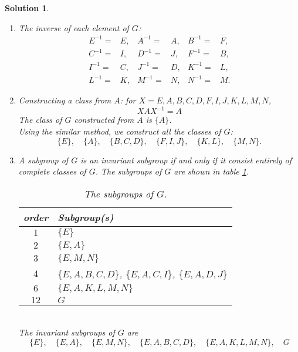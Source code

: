 \documentclass[UTF8,10pt,a4paper]{article}
\theoremstyle{Problem}
\theoremstyle{Solution}
\newtheorem*{sol}{Solution}
\begin{document}
\begin{sol}
    \begin{enumerate}
        \item[(a)] The inverse of each element of $G$:
        \begin{align*}
            E^{-1}=&E,&A^{-1}=&A,&B^{-1}=&F,\\
            C^{-1}=&I,&D^{-1}=&J,&F^{-1}=&B,\\
            I^{-1}=&C,&J^{-1}=&D,&K^{-1}=&L,\\
            L^{-1}=&K,&M^{-1}=&N,&N^{-1}=&M.
        \end{align*}
        \item[(b)] Constructing a class from $A$: for $X=E,A,B,C,D,F,I,J,K,L,M,N$,
        \begin{equation}
            XAX^{-1}=A
        \end{equation}
        The class of $G$ constructed from $A$ is $\{A\}$.\\
        Using the similar method, we construct all the classes of $G$:
        \[
            \{E\},\quad\{A\},\quad\{B,C,D\},\quad\{F,I,J\},\quad\{K,L\},\quad\{M,N\}.
        \]
        \item[(c)] A subgroup of $G$ is an invariant subgroup if and only if it consist entirely of complete classes of $G$. The subgroups of $G$ are shown in table \ref{1-G-subgroup}.
        \begin{table}[h]
            \centering
            \caption{The subgroups of $G$.}
            \label{1-G-subgroup}
            \begin{tabular}{c|l}
            order & Subgroup(s) \\ \hline
            $1$ & $\{E\}$ \\
            $2$ & $\{E,A\}$ \\
            $3$ & $\{E,M,N\}$ \\
            $4$ & $\{E,A,B,C,D\}$, $\{E,A,C,I\}$, $\{E,A,D,J\}$ \\
            $6$ & $\{E,A,K,L,M,N\}$ \\
            $12$ & $G$
            \end{tabular}
            \end{table}
            \\The invariant subgroups of $G$ are
            \[
                \{E\},\quad\{E,A\},\quad\{E,M,N\},\quad\{E,A,B,C,D\},\quad\{E,A,K,L,M,N\},\quad G
            \]
    \end{enumerate}
\end{sol}
\end{document}
